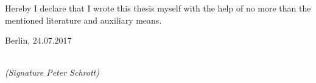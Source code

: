 \newpage

\thispagestyle{empty}

\begin{large}

\vspace*{6cm}

\noindent
Hereby I declare that I wrote this thesis myself with the help of no more than the mentioned literature and auxiliary means.
\vspace{2cm}

\noindent
Berlin, 24.07.2017

\vspace{3cm}

\hspace*{7cm}%
\dotfill\\
\hspace*{8.5cm}%
\textit{(Signature Peter Schrott)}

\end{large}
